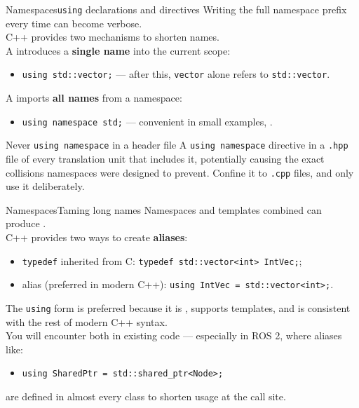 \begin{frame}{Namespaces}{\texttt{using} declarations and directives}
	\justifying
	Writing the full namespace prefix every time can become verbose.\\
	C++ provides two mechanisms to shorten names.\\
	\bigskip
	A  introduces a \textbf{single name} into the current scope:
	\begin{itemize}
		\item \texttt{using std::vector;} — after this, \texttt{vector} alone refers to \texttt{std::vector}.
	\end{itemize}
	\bigskip
	A  imports \textbf{all names} from a namespace:
	\begin{itemize}
		\item \texttt{using namespace std;} — convenient in small examples, .
	\end{itemize}
	\bigskip
	\begin{alertblock}{Never \texttt{using namespace} in a header file}
		\justifying
		A \texttt{using namespace} directive in a \texttt{.hpp} file  of every translation unit that includes it, potentially causing the exact collisions namespaces were designed to prevent.
		Confine it to \texttt{.cpp} files, and only use it deliberately.
	\end{alertblock}
\end{frame}

\begin{frame}{Namespaces}{Taming long names}
	\justifying
	Namespaces and templates combined can produce .\\
	C++ provides two ways to create \textbf{aliases}:
	\begin{itemize}
		\item \texttt{typedef} inherited from C: \texttt{typedef std::vector<int> IntVec;};
		\item {} alias (preferred in modern C++): \texttt{using IntVec = std::vector<int>;}.
	\end{itemize}
	\bigskip
	The \texttt{using} form is preferred because it is , supports templates, and is consistent with the rest of modern C++ syntax.\\
	\bigskip
	You will encounter both in existing code — especially in ROS 2, where aliases like:
	\begin{itemize}
		\item \texttt{using SharedPtr = std::shared\_ptr<Node>;}
	\end{itemize}
	are defined in almost every class to shorten usage at the call site.
\end{frame}
